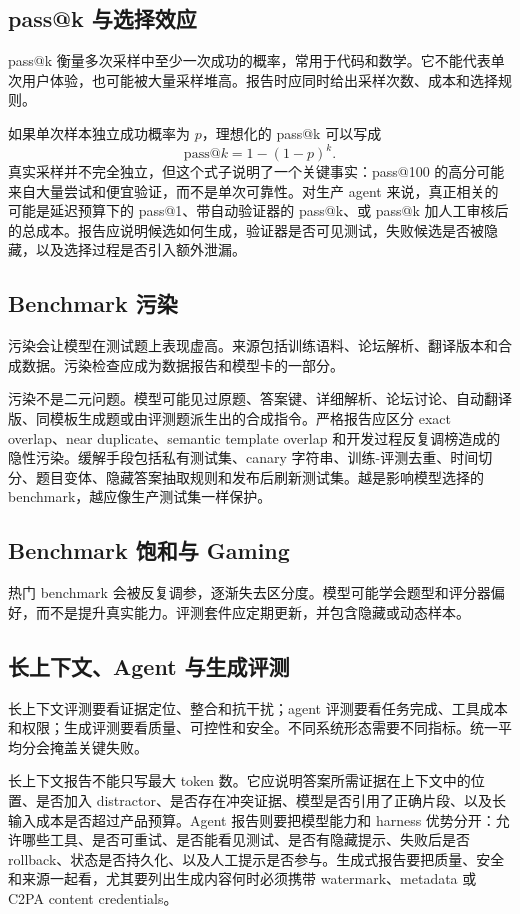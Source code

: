 \documentclass[UTF8,zihao=-4,openany]{ctexbook}
\begin{document}
\subsection{pass@k 与选择效应}
pass@k 衡量多次采样中至少一次成功的概率，常用于代码和数学。它不能代表单次用户体验，也可能被大量采样堆高。报告时应同时给出采样次数、成本和选择规则。

如果单次样本独立成功概率为 $p$，理想化的 pass@k 可以写成
\[
  \mathrm{pass@}k=1-(1-p)^k .
\]
真实采样并不完全独立，但这个式子说明了一个关键事实：pass@100 的高分可能来自大量尝试和便宜验证，而不是单次可靠性。对生产 agent 来说，真正相关的可能是延迟预算下的 pass@1、带自动验证器的 pass@k、或 pass@k 加人工审核后的总成本。报告应说明候选如何生成，验证器是否可见测试，失败候选是否被隐藏，以及选择过程是否引入额外泄漏。

\subsection{Benchmark 污染}
污染会让模型在测试题上表现虚高。来源包括训练语料、论坛解析、翻译版本和合成数据。污染检查应成为数据报告和模型卡的一部分。

污染不是二元问题。模型可能见过原题、答案键、详细解析、论坛讨论、自动翻译版、同模板生成题或由评测题派生出的合成指令。严格报告应区分 exact overlap、near duplicate、semantic template overlap 和开发过程反复调榜造成的隐性污染。缓解手段包括私有测试集、canary 字符串、训练-评测去重、时间切分、题目变体、隐藏答案抽取规则和发布后刷新测试集。越是影响模型选择的 benchmark，越应像生产测试集一样保护。

\subsection{Benchmark 饱和与 Gaming}
热门 benchmark 会被反复调参，逐渐失去区分度。模型可能学会题型和评分器偏好，而不是提升真实能力。评测套件应定期更新，并包含隐藏或动态样本。

\subsection{长上下文、Agent 与生成评测}
长上下文评测要看证据定位、整合和抗干扰；agent 评测要看任务完成、工具成本和权限；生成评测要看质量、可控性和安全。不同系统形态需要不同指标。统一平均分会掩盖关键失败。

长上下文报告不能只写最大 token 数。它应说明答案所需证据在上下文中的位置、是否加入 distractor、是否存在冲突证据、模型是否引用了正确片段、以及长输入成本是否超过产品预算。Agent 报告则要把模型能力和 harness 优势分开：允许哪些工具、是否可重试、是否能看见测试、是否有隐藏提示、失败后是否 rollback、状态是否持久化、以及人工提示是否参与。生成式报告要把质量、安全和来源一起看，尤其要列出生成内容何时必须携带 watermark、metadata 或 C2PA content credentials。
\end{document}

